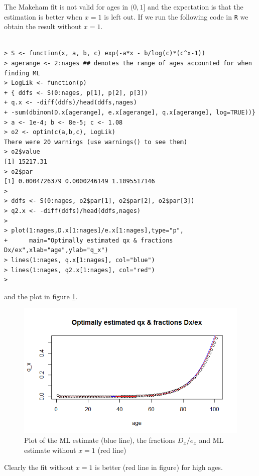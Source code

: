 The Makeham fit is not valid for ages in $(0,1]$ and the expectation is that the estimation is better when $x=1$ is left out. If we run the following code in \verb|R| we obtain the result without $x=1$.
\begin{verbatim}

> S <- function(x, a, b, c) exp(-a*x - b/log(c)*(c^x-1))
> agerange <- 2:nages ## denotes the range of ages accounted for when finding ML
> LogLik <- function(p)
+ { ddfs <- S(0:nages, p[1], p[2], p[3])
+ q.x <- -diff(ddfs)/head(ddfs,nages)
+ -sum(dbinom(D.x[agerange], e.x[agerange], q.x[agerange], log=TRUE))}
> a <- 1e-4; b <- 8e-5; c <- 1.08
> o2 <- optim(c(a,b,c), LogLik) 
There were 20 warnings (use warnings() to see them)
> o2$value
[1] 15217.31
> o2$par
[1] 0.0004726379 0.0000246149 1.1095517146
> 
> ddfs <- S(0:nages, o2$par[1], o2$par[2], o2$par[3])
> q2.x <- -diff(ddfs)/head(ddfs,nages)
> 
> plot(1:nages,D.x[1:nages]/e.x[1:nages],type="p",
+      main="Optimally estimated qx & fractions Dx/ex",xlab="age",ylab="q_x")
> lines(1:nages, q.x[1:nages], col="blue")
> lines(1:nages, q2.x[1:nages], col="red")
>
\end{verbatim}

and the plot in figure \ref{Figure_Question9_2}.

\begin{center}
\begin{figure}[H]

\includegraphics[scale=1]{Question_9_MakehamGompertz_2.png}

\caption{Plot of the ML estimate (blue line), the fractions $D_x/e_x$ and ML estimate without $x=1$ (red line)}
\label{Figure_Question9_2}

\end{figure}
\end{center}
Clearly the fit without $x=1$ is better (red line in figure) for high ages.

